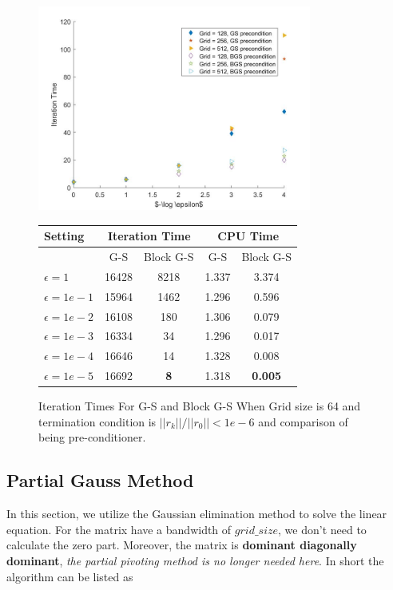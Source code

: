 \documentclass[12pt]{amsart}
\begin{document}
\begin{figure}[H]
	\begin{minipage}{0.48\linewidth}
		\centerline{\includegraphics[width=9.0cm]{final.jpg}}
	\end{minipage}
	\hfill
	\begin{minipage}{.48\linewidth}
			\centering
			\begin{tabular}{|l|c|c|c|c|}\hline
				Setting&\multicolumn{2}{c|}{Iteration Time}&\multicolumn{2}{c|}{CPU Time}\\\hline\hline
				&G-S&Block G-S&G-S&Block G-S\\
				\hline\hline
				$\epsilon=1$&16428&8218&1.337&3.374\\
				\hline
				$\epsilon=1e-1$&15964&1462&1.296&0.596\\
				\hline
				$\epsilon=1e-2$&16108&180&1.306&0.079\\
				\hline
				$\epsilon=1e-3$&16334&34&1.296&0.017\\
				\hline
				$\epsilon=1e-4$&16646&14&1.328&0.008\\
				\hline
				$\epsilon=1e-5$&16692&\textbf{8}&1.318&\textbf{0.005}\\\hline\hline
			\end{tabular}
			
	\end{minipage}
	\caption{Iteration Times For G-S and Block G-S When Grid size is 64 and termination condition is $||r_k||/||r_0||<1e-6$ and comparison of being pre-conditioner.}
	\label{zrotate}
\end{figure}



\subsection{Partial Gauss Method}

In this section, we utilize the Gaussian elimination method to solve the linear equation. For the matrix have a bandwidth of $grid\_size$, we don't need to calculate the zero part. Moreover, the matrix is \textbf{dominant diagonally dominant}, \emph{the partial pivoting method is no longer needed here}. In short the algorithm can be listed as
\end{document}
